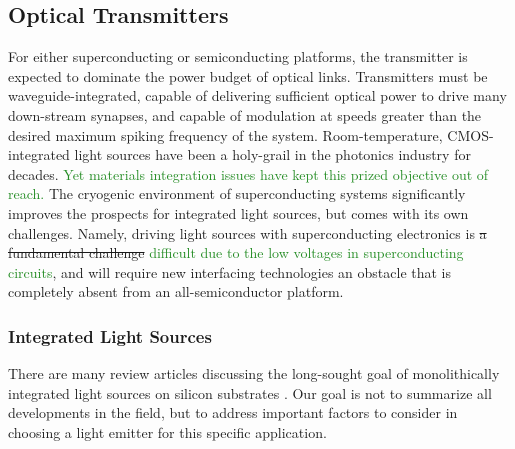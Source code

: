 \documentclass[twocolumn]{article}
\begin{document}
\subsection{Optical Transmitters}
For either superconducting or semiconducting platforms, the transmitter is expected to dominate the power budget of optical links. Transmitters must be waveguide-integrated, capable of delivering sufficient optical power to drive many down-stream synapses, and capable of modulation at speeds greater than the desired maximum spiking frequency of the system. Room-temperature, CMOS-integrated light sources have been a holy-grail in the photonics industry for decades. \textcolor{ForestGreen}{Yet materials integration issues have kept this prized objective out of reach.} The cryogenic environment of superconducting systems significantly improves the prospects for integrated light sources, but comes with its own challenges. Namely, driving light sources with superconducting electronics is \sout{a fundamental challenge} \textcolor{ForestGreen}{difficult due to the low voltages in superconducting circuits}, and will require new interfacing technologies\cite{} \textemdash an obstacle that is completely absent from an all-semiconductor platform.

\subsubsection{Integrated Light Sources}
There are many review articles discussing the long-sought goal of monolithically integrated light sources on silicon substrates \cite{}. Our goal is not to summarize all developments in the field, but to address important factors to consider in choosing a light emitter for this specific application.
\end{document}
